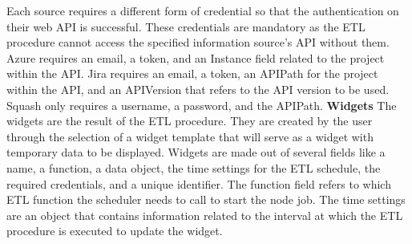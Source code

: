 \documentclass[a4paper,twoside,10pt]{report}
\begin{document}
\begin{center}
\end{center}
Each source requires a different form of credential so that the authentication on their web API is successful. These credentials are mandatory as the ETL procedure cannot access the specified information source's API without them.
\newline
Azure requires an email, a token, and an Instance field related to the project within the API.
\newline
Jira requires an email, a token, an APIPath for the project within the API, and an APIVersion that refers to the API version to be used.
\newline
Squash only requires a username, a password, and the APIPath.
\newline
\newline
\textbf{Widgets}
\newline
The widgets are the result of the ETL procedure.
\newline
They are created by the user through the selection of a widget template that will serve as a widget with temporary data to be displayed.
\newline
Widgets are made out of several fields like a name, a function, a data object, the time settings for the ETL schedule, the required credentials, and a unique identifier.
\newline
The function field refers to which ETL function the scheduler needs to call to start the node job.
\newline
The time settings are an object that contains information related to the interval at which the ETL procedure is executed to update the widget. 
\newline
\end{document}
